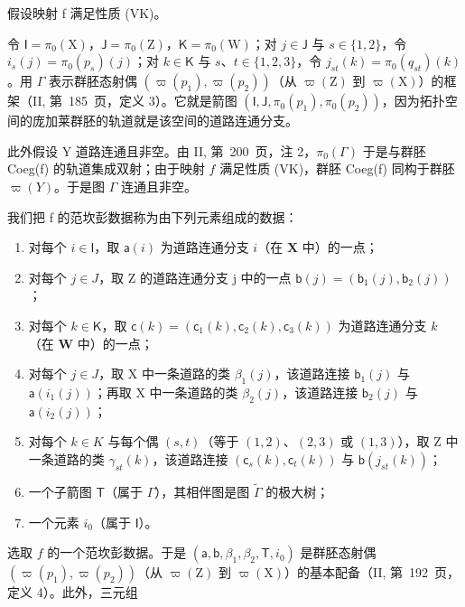 假设映射 f 满足性质 (VK)。

令 \(\mathsf{I} = \pi_0(\mathrm{X})\)，\(\mathsf{J} = \pi_0(\mathrm{Z})\)，\(\mathsf{K} = \pi_0(\mathrm{W})\)；对 \(j \in \mathsf{J}\) 与 \(s \in \{1,2\}\)，令 \(i_s(j) = \pi_0(p_s)(j)\)；对 \(k \in \mathsf{K}\) 与 \(s\)、\(t \in \{1,2,3\}\)，令 \(j_{st}(k) = \pi_0(q_{st})(k)\)。用 \(\Gamma\) 表示群胚态射偶 \((\varpi(p_1), \varpi(p_2))\)（从 \(\varpi(\mathrm{Z})\) 到 \(\varpi(\mathrm{X})\)）的框架（II, 第~185~页，定义 3）。它就是箭图 \((\mathsf{I}, \mathsf{J}, \pi_0(p_1), \pi_0(p_2))\)，因为拓扑空间的庞加莱群胚的轨道就是该空间的道路连通分支。

此外假设 Y 道路连通且非空。由 II, 第~200~页，注 2，\(\pi_0(\Gamma)\) 于是与群胚 Coeg(f) 的轨道集成双射；由于映射 \(f\) 满足性质 (VK)，群胚 Coeg(f) 同构于群胚 \(\varpi(Y)\)。于是图 \(\Gamma\) 连通且非空。

我们把 f 的范坎彭数据称为由下列元素组成的数据：

\begin{enumerate}
\def\labelenumi{(\roman{enumi})}
\item
  对每个 \(i \in \mathsf{I}\)，取 \(\mathsf{a}(i)\) 为道路连通分支 \(i\)（在 \(\mathbf{X}\) 中）的一点；
\item
  对每个 \(j \in J\)，取 Z 的道路连通分支 j 中的一点 \(\mathsf{b}(j) = (\mathsf{b}_{1}(j), \mathsf{b}_{2}(j))\)；
\item
  对每个 \(k \in \mathsf{K}\)，取 \(\mathsf{c}(k) = (\mathsf{c}_1(k), \mathsf{c}_2(k), \mathsf{c}_3(k))\) 为道路连通分支 \(k\)（在 \(\mathbf{W}\) 中）的一点；
\item
  对每个 \(j \in J\)，取 X 中一条道路的类 \(\beta_{1}(j)\)，该道路连接 \(\mathsf{b}_{1}(j)\) 与 \(\mathsf{a}(i_{1}(j))\)；再取 X 中一条道路的类 \(\beta_{2}(j)\)，该道路连接 \(\mathsf{b}_{2}(j)\) 与 \(\mathsf{a}(i_{2}(j))\)；
\item
  对每个 \(k \in K\) 与每个偶 \((s, t)\)（等于 \((1, 2)\)、\((2, 3)\) 或 \((1, 3)\)），取 Z 中一条道路的类 \(\gamma_{st}(k)\)，该道路连接 \((\mathsf{c}_{s}(k), \mathsf{c}_{t}(k))\) 与 \(\mathsf{b}(j_{st}(k))\)；
\item
  一个子箭图 \(\mathsf{T}\)（属于 \(\Gamma\)），其相伴图是图 \(\widetilde{\Gamma}\) 的极大树；
\item
  一个元素 \(i_{0}\)（属于 \(\mathsf{I}\)）。
\end{enumerate}

选取 \(f\) 的一个范坎彭数据。于是 \((\mathsf{a},\mathsf{b},\beta_{1},\beta_{2},\mathsf{T},i_{0})\) 是群胚态射偶 \((\varpi(p_{1}),\varpi(p_{2}))\)（从 \(\varpi(\mathrm{Z})\) 到 \(\varpi(\mathrm{X})\)）的基本配备（II, 第~192~页，定义 4）。此外，三元组

